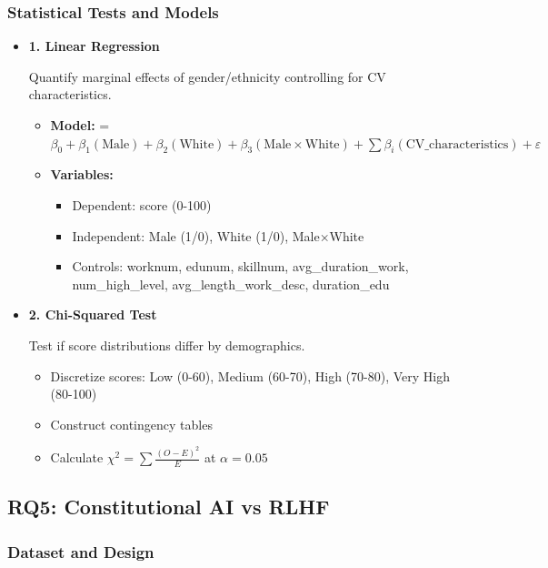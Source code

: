 \documentclass{article}
\begin{document}
\subsubsection{Statistical Tests and Models}

\begin{itemize}
\item \textbf{1. Linear Regression}

Quantify marginal effects of gender/ethnicity controlling for CV characteristics.
\begin{itemize}
\item \textbf{Model:} 
 = $\beta_0 + \beta_1(\text{Male}) + \beta_2(\text{White}) + \beta_3(\text{Male} \times \text{White}) + 
\sum\beta_i(\text{CV\_characteristics}) + \varepsilon$

\item \textbf{Variables:}
\begin{itemize}
    \item Dependent: score (0-100)
    \item Independent: Male (1/0), White (1/0), Male×White
    \item Controls: worknum, edunum, skillnum, avg\_duration\_work, num\_high\_level, avg\_length\_work\_desc, duration\_edu
\end{itemize}
\end{itemize}


\item \textbf{2. Chi-Squared Test}

Test if score distributions differ by demographics.
\begin{itemize}
    \item Discretize scores: Low (0-60), Medium (60-70), High (70-80), Very High (80-100)
    \item Construct contingency tables
    \item Calculate $\chi^2 = \sum\frac{(O - E)^2}{E}$ at $\alpha = 0.05$
\end{itemize}
\end{itemize}


\subsection{RQ5: Constitutional AI vs RLHF}

\subsubsection{Dataset and Design}
\end{document}
